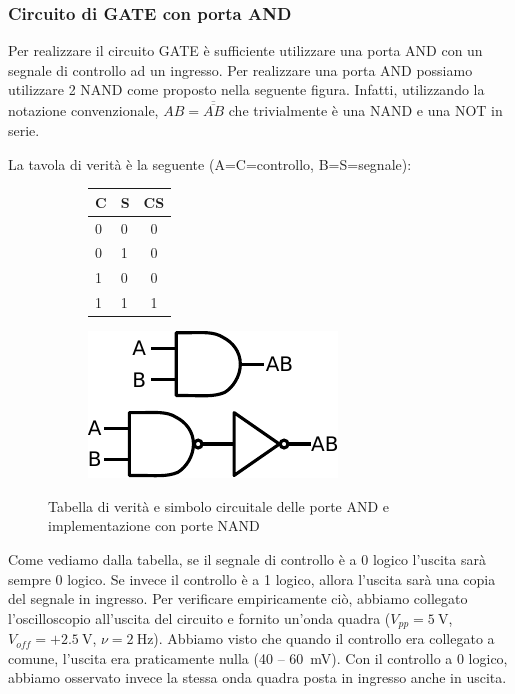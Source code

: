 \subsubsection{Circuito di GATE con porta AND}

Per realizzare il circuito GATE è sufficiente utilizzare una porta AND con un segnale di controllo ad un ingresso.
Per realizzare una porta AND possiamo utilizzare 2 NAND come proposto nella seguente figura.
Infatti, utilizzando la notazione convenzionale, $AB=\overline {\overline {AB}}$ che trivialmente è una NAND e una NOT in serie.

La tavola di verità è la seguente (A=C=controllo, B=S=segnale):

\begin{figure}[htpc]
\centering
	\begin{subfigure}[hc]{.4\textwidth}
		\centering
		{\renewcommand{\arraystretch}{1.1}%
		\begin{tabular}{|l|l|c|}
		\hline
		C & S & CS \\
		\hline
		0 & 0 & 0\\
		\hline
		0 & 1 & 0\\
		\hline
		1 & 0 & 0\\
		\hline
		1 & 1 & 1\\
		\hline
		\end{tabular}}
		\label{tab9:AND}
        \end{subfigure}
        \begin{subfigure}[hc]{.4\textwidth}
		\centering
		\includegraphics[width=.5\textwidth]{../E09/latex/AND.pdf}
		\label{cir9:AND}
        \end{subfigure}
\caption{Tabella di verità e simbolo circuitale delle porte AND e implementazione con porte NAND}
\end{figure}

Come vediamo dalla tabella, se il segnale di controllo è a 0 logico l'uscita sarà sempre 0 logico.
Se invece il controllo è a 1 logico, allora l'uscita sarà una copia del segnale in ingresso.
Per verificare empiricamente ciò, abbiamo collegato l'oscilloscopio all'uscita del circuito e fornito un'onda quadra ($V_{pp}=\SI{5}{\volt}$, $V_{off}=+\SI{2.5}{\volt}$, $\nu=\SI{2}{\hertz}$).
Abbiamo visto che quando il controllo era collegato a comune, l'uscita era praticamente nulla (\num{40} -- \SI{60}{\mV}).
Con il controllo a 0 logico, abbiamo osservato invece la stessa onda quadra posta in ingresso anche in uscita.

